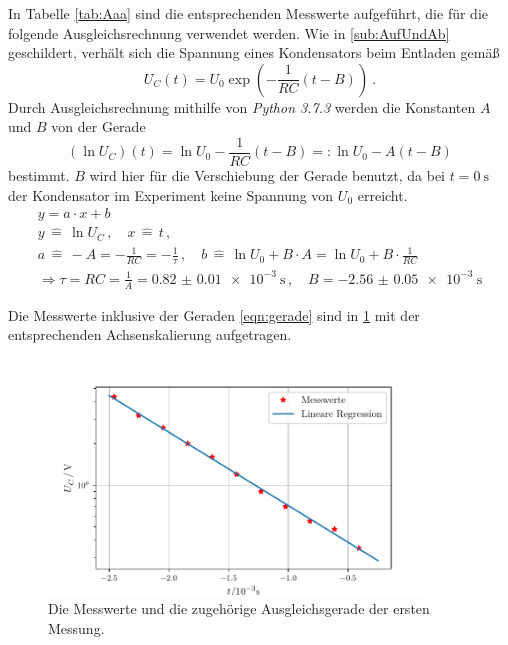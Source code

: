 In Tabelle \ref{tab:Aaa} sind die entsprechenden Messwerte aufgeführt, die für die folgende Ausgleichsrechnung verwendet werden. 
Wie in \ref{sub:AufUndAb} geschildert, verhält sich die Spannung eines Kondensators beim Entladen gemäß 
\begin{equation}
    U_C(t)=U_0 \exp(-\frac{1}{RC}(t-B))\:.
\end{equation}
Durch Ausgleichsrechnung mithilfe von \textit{Python 3.7.3} werden die Konstanten $A$ und $B$ von der Gerade
\begin{equation}
    (\ln{U_C})(t) = \ln{U_0} -\frac{1}{RC}(t-B) =: \ln{U_0} -A(t-B)
    \label{eqn:gerade} %
\end{equation} 
bestimmt. $B$ wird hier für die Verschiebung der Gerade benutzt, da bei ${t=\SI{0}{\second}}$ der Kondensator im Experiment 
keine Spannung von $U_0$ erreicht. 
\begin{gather}
    y=a\cdot x + b \\
    y \,\widehat{=}\, \ln{U_C} \,, \quad
    x \,\widehat{=}\, t\,, \\
    a \,\widehat{=}\,-A=-\frac{1}{RC}=-\frac{1}{\tau} \,, \quad
    b \,\widehat{=}\, \ln{U_0} +B\cdot A = \ln{U_0} +B\cdot \frac{1}{RC} \\
    \Rightarrow 
    \tau=RC=\frac{1}{A}=\SI{0.82(1)e-3}{\second} \,, \quad 
    B=\SI{-2.56(5)e-3}{\second} 
\end{gather}

Die Messwerte inklusive der Geraden \eqref{eqn:gerade} sind in \ref{fig:ausgl_gr_A} 
mit der entsprechenden Achsenskalierung aufgetragen. 

\begin{figure}
    \centering
    \includegraphics[width=0.9\textwidth]{plots/ausgleichsgerade.pdf}
    \caption{Die Messwerte und die zugehörige Ausgleichsgerade der ersten Messung.}
    \label{fig:ausgl_gr_A}
\end{figure}

